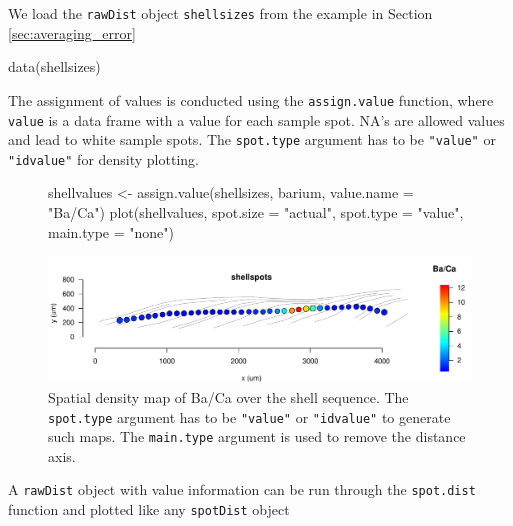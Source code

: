 \documentclass[11pt, a4paper]{article}
\newcommand{\mnote}[1]
{\marginnote{\footnotesize \raggedright \texttt{#1}}}
\begin{document}
We load the \texttt{rawDist} object \texttt{shellsizes} from the example in Section \ref{sec:averaging_error}

\begin{Schunk}
\begin{Sinput}
 data(shellsizes)
\end{Sinput}
\end{Schunk}

\mnote{assign.
value} The assignment of values is conducted using the \texttt{assign.value} function, where \texttt{value} is a data frame with a value for each sample spot. NA's are allowed values and lead to white sample spots. The \texttt{spot.type} argument has to be \texttt{"value"} or \texttt{"idvalue"} for density plotting.

\begin{figure}[H]
\begin{center}
\begin{Schunk}
\begin{Sinput}
 shellvalues <- assign.value(shellsizes, barium, value.name = "Ba/Ca")
 plot(shellvalues, spot.size = "actual", spot.type = "value", main.type = "none")
\end{Sinput}
\end{Schunk}
\includegraphics{sclero_tutorial-plotvalues}
\end{center}
\caption{Spatial density map of Ba/Ca over the shell sequence. The \texttt{spot.type} argument has to be \texttt{"value"} or \texttt{"idvalue"} to generate such maps. The \texttt{main.type} argument is used to remove the distance axis.}
\end{figure}

A \texttt{rawDist} object with value information can be run through the \texttt{spot.dist} function and plotted like any \texttt{spotDist} object
\end{document}
